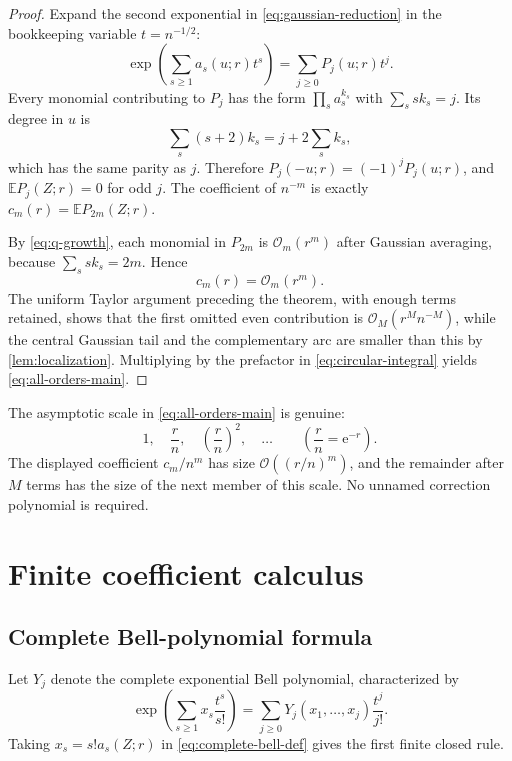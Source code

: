 \documentclass[11pt,a4paper]{article}
\theoremstyle{definition}
\theoremstyle{remark}
\newcommand{\E}{\mathbb E}
\newcommand{\ee}{\mathrm e}
\newcommand{\BigO}{\mathcal O}
\begin{document}
\begin{proof}
Expand the second exponential in \cref{eq:gaussian-reduction} in the bookkeeping
variable \(t=n^{-1/2}\):
\begin{equation}\label{eq:formal-expansion-Pj}
 \exp\!\left(\sum_{s\ge1}a_s(u;r)t^s\right)
 =\sum_{j\ge0}P_j(u;r)t^j.
\end{equation}
Every monomial contributing to \(P_j\) has the form
\(\prod_s a_s^{k_s}\) with \(\sum_s sk_s=j\).  Its degree in \(u\) is
\[
 \sum_s(s+2)k_s=j+2\sum_s k_s,
\]
which has the same parity as \(j\).  Therefore \(P_j(-u;r)=(-1)^jP_j(u;r)\),
and \(\E P_j(Z;r)=0\) for odd \(j\).  The coefficient of \(n^{-m}\) is
exactly \(c_m(r)=\E P_{2m}(Z;r)\).

By \cref{eq:q-growth}, each monomial in \(P_{2m}\) is
\(\BigO_m(r^m)\) after Gaussian averaging, because
\(\sum_s sk_s=2m\).  Hence
\begin{equation}\label{eq:cm-growth-preliminary}
 c_m(r)=\BigO_m(r^m).
\end{equation}
The uniform Taylor argument preceding the theorem, with enough terms retained,
shows that the first omitted even contribution is
\(\BigO_M(r^M n^{-M})\), while the central Gaussian tail and the complementary
arc are smaller than this by \cref{lem:localization}.  Multiplying by the
prefactor in \cref{eq:circular-integral} yields
\cref{eq:all-orders-main}.
\end{proof}

\begin{masterbox}
The asymptotic scale in \cref{eq:all-orders-main} is genuine:
\[
  1,\quad \frac rn,\quad \left(\frac rn\right)^2,\quad\ldots
  \qquad\left(\frac rn=\ee^{-r}\right).
\]
The displayed coefficient \(c_m/n^m\) has size \(\BigO((r/n)^m)\), and the
remainder after \(M\) terms has the size of the next member of this scale.  No
unnamed correction polynomial is required.
\end{masterbox}

\section{Finite coefficient calculus}\label{sec:coeffcalc}

\subsection{Complete Bell-polynomial formula}

Let \(Y_j\) denote the complete exponential Bell polynomial, characterized by
\begin{equation}\label{eq:complete-bell-def}
 \exp\!\left(\sum_{s\ge1}x_s\frac{t^s}{s!}\right)
 =\sum_{j\ge0}Y_j(x_1,\ldots,x_j)\frac{t^j}{j!}.
\end{equation}
Taking \(x_s=s!a_s(Z;r)\) in \cref{eq:complete-bell-def} gives the first finite
closed rule.
\end{document}
